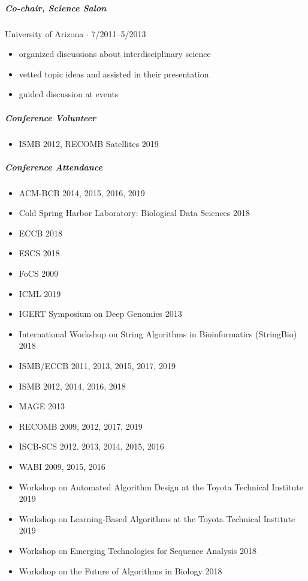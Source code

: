 \documentclass[10pt,letterpaper]{article}
\newcommand{\bigdot}{$\cdot$\xspace}
\begin{document}
\subparagraph{Co-chair, Science Salon}
University of Arizona \bigdot 7/2011--5/2013
\begin{itemize}
    \item organized discussions about interdisciplinary science
    \item vetted topic ideas and assisted in their presentation
    \item guided discussion at events
\end{itemize}

\subparagraph{Conference Volunteer}
\begin{itemize}
	\item ISMB 2012, RECOMB Satellites 2019
\end{itemize}

\newpage
\subparagraph{Conference Attendance}
\begin{itemize}
	\item ACM-BCB 2014, 2015, 2016, 2019
	\item Cold Spring Harbor Laboratory: Biological Data Sciences 2018
	\item ECCB 2018
	\item ESCS 2018
	\item FoCS 2009
	\item ICML 2019
	\item IGERT Symposium on Deep Genomics 2013
	\item International Workshop on String Algorithms in Bioinformatics (StringBio) 2018
	\item ISMB/ECCB 2011, 2013, 2015, 2017, 2019
	\item ISMB 2012, 2014, 2016, 2018
	\item MAGE 2013
	\item RECOMB 2009, 2012, 2017, 2019
	\item ISCB-SCS 2012, 2013, 2014, 2015, 2016
	\item WABI 2009, 2015, 2016
	\item Workshop on Automated Algorithm Design at the Toyota Technical Institute 2019
	\item Workshop on Learning-Based Algorithms at the Toyota Technical Institute 2019
	\item Workshop on Emerging Technologies for Sequence Analysis 2018
	\item Workshop on the Future of Algorithms in Biology 2018
\end{itemize}
\end{document}

